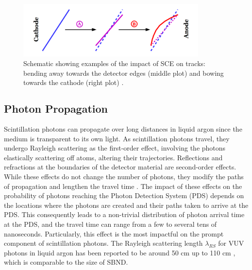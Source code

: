 \begin{figure}[htbp] 
\centering    
\includegraphics[width=0.85\textwidth]{SCE}
\caption[Impacts of Space Charge Effects on Tracks]{
Schematic showing examples of the impact of SCE on tracks: bending away towards the detector edges (middle plot) and bowing towards the cathode (right plot) \cite{SCE}.
}
\label{fig:SCE}
\end{figure}


\subsection{Photon Propagation}
\label{sec:photonprop}


Scintillation photons can propagate over long distances in liquid argon since the medium is transparent to its own light.
As scintillation photons travel, they undergo Rayleigh scattering as the first-order effect, involving the photons elastically scattering off atoms, altering their trajectories. 
Reflections and refractions at the boundaries of the detector material are second-order effects. 
While these effects do not change the number of photons, they modify the paths of propagation and lengthen the travel time \cite{sbnd_pds_paper}. 
The impact of these effects on the probability of photons reaching the Photon Detection System (PDS) depends on the locations where the photons are created and their paths taken to arrive at the PDS. 
This consequently leads to a non-trivial distribution of photon arrival time at the PDS, and the travel time can range from a few to several tens of nanoseconds.
Particularly, this effect is the most impactful on the prompt component of scintillation photons.
The Rayleigh scattering length $\lambda_{RS}$ for VUV photons in liquid argon has been reported to be around 50 cm \cite{rayleigh50} up to 110 cm \cite{rayleigh110}, which is comparable to the size of SBND.


